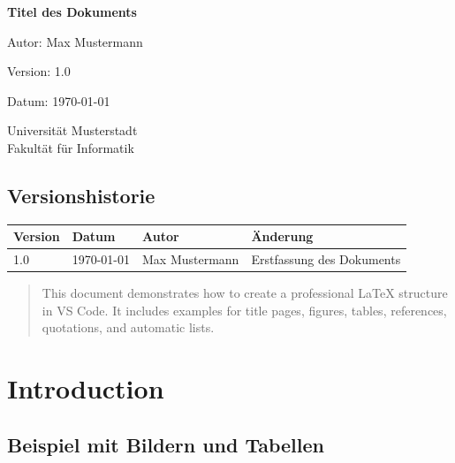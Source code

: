 \documentclass[a4paper,12pt]{report}
\begin{document}
\begin{titlepage}
    \centering
    {\Huge \textbf{Titel des Dokuments}\par}
    \vspace{2cm}
    {\Large Autor: Max Mustermann\par}
    {\large Version: 1.0\par}
    {\large Datum: \today\par}
    \vfill
    {\large Universität Musterstadt \\ Fakultät für Informatik}
\end{titlepage}

\section*{Versionshistorie}
\begin{tabular}{lllp{8cm}}
\toprule
\textbf{Version} & \textbf{Datum} & \textbf{Autor} & \textbf{Änderung} \\
\midrule
1.0 & \today & Max Mustermann & Erstfassung des Dokuments \\
\bottomrule
\end{tabular}
\newpage

\begin{abstract}
This document demonstrates how to create a professional LaTeX structure in VS Code. 
It includes examples for title pages, figures, tables, references, quotations, and automatic lists.
\end{abstract}
\newpage

\tableofcontents
\newpage
\listoffigures
\newpage
\listoftables
\newpage

\chapter{Introduction}



\section{Beispiel mit Bildern und Tabellen}
\end{document}
